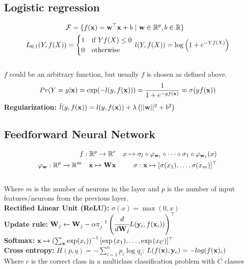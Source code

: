 %
\begin{mdframed}[style=eqbox]
\subsection{Logistic regression}
\vspace*{-6pt}\begin{align*}
  \mathcal{F} = \{f(\mathbf{x}) = \mathbf{w}^\top \mathbf{x} + b &~\vert~ \mathbf{w} \in \mathbb R^p, b \in \mathbb R\}\\
  L_{0,1}(Y, f(X)) = \begin{cases}
    1 & \text{if } Y f(X) \leq 0\\
    0 & \text{otherwise}
  \end{cases}&~
  l(Y, f(X)) = \log \left(1 + e^{-Y f(X)}\right)
\end{align*}\vspace*{-12pt}\\
\small{$f$ could be an arbitrary function, but usually $f$ is chosen as defined above.}
\begin{align*}
  Pr(Y = y \vert \mathbf{x}) = \exp( - l(y, f(\mathbf{x}))) = \frac{1}{1 + e^{-y f(\mathbf{x})}} = \sigma(y f(\mathbf{x}))
\end{align*}
\textbf{Regularization:} $\tilde{l}(y, f(\mathbf{x})) = l(y, f(\mathbf{x})) + \lambda \left(\vert\vert \mathbf{w} \vert\vert^2 + b^2\right)$
\end{mdframed}
%
\begin{mdframed}[style=eqbox]
\subsection{Feedforward Neural Network}
\vspace*{-6pt}\begin{align*}
  f: \mathbb{R}^p \to \mathbb R^r && x \mapsto \sigma_l \circ \varphi_{\mathbf{w}_l} \circ \cdots \circ \sigma_1 \circ \varphi_{\mathbf{w}_1}(x)\\
  \varphi_{\mathbf{w}}: \mathbb R^p \to \mathbb R^m \quad \mathbf{x} \mapsto \mathbf{W} \mathbf{x} && \sigma: \mathbf{x} \mapsto [\sigma(x_1), \ldots, \sigma(x_m)]^\top
\end{align*}\vspace*{-14pt}\\
\small{Where $m$ is the number of neurons in the layer and $p$ is the number of input features/neurons from the previous layer.}\\
\textbf{Rectified Linear Unit (ReLU):} $\sigma(x) = \max(0, x)$\\
\textbf{Update rule:} $\mathbf{W}_{j} \gets \mathbf{W}_{j} - \alpha \pi_j^{-1}\left( \cfrac{d}{d \mathbf{W}_j} L(\mathbf{y}_i, f(\mathbf{x}_i))\right)^\top$\\
\textbf{Softmax:} $\mathbf{x} \mapsto \left(\sum_{\mathbf{x}} \exp(x_i)\right)^{-1} [\exp{(x_1)}, \ldots, \exp{(x_C)}]^\top$\\
\textbf{Cross entropy:} $H(p,q) = -\sum_{i=1}^{n} p_i \log q_i$; $L(f(\mathbf{x}), \mathbf{y}_c) = - log(f(\mathbf{x})_c)$\\[0.25em]
\small{Where $c$ is the correct class in a multiclass classification problem with $C$ classes}
\end{mdframed}
